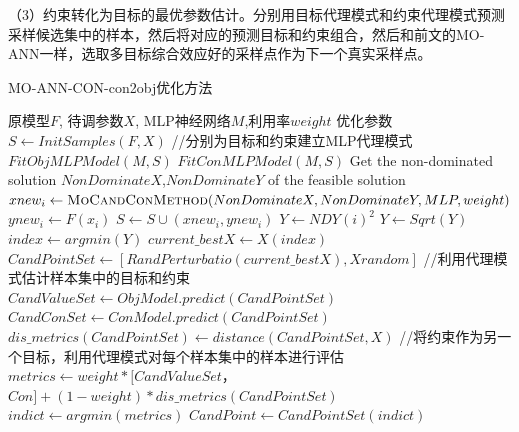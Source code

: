 （3）约束转化为目标的最优参数估计。分别用目标代理模式和约束代理模式预测采样候选集中的样本，然后将对应的预测目标和约束组合，然后和前文的MO-ANN一样，选取多目标综合效应好的采样点作为下一个真实采样点。

\renewcommand{\algorithmicrequire}{\textbf{输入:}}
\renewcommand{\algorithmicensure}{\textbf{输出:}}
\begin{algorithm}
        \caption{MO-ANN-CON-con2obj优化方法}
        \begin{algorithmic}[1] %
            \Require 原模型$F$, 待调参数$X$, MLP神经网络$M$,利用率$weight$
            \Ensure 优化参数
            \State $S \gets InitSamples( F, X )$
            \State //分别为目标和约束建立MLP代理模式
                \State $FitObjMLPModel(M, S)$
                 \State $FitConMLPModel(M, S)$
                 \State Get the non-dominated solution $NonDominateX$,$NonDominateY$ of the feasible solution 
                \State $xnew_i \gets \Call {MoCandConMethod}{NonDominateX,NonDominateY,MLP,weight}$
                \State $ynew_i \gets F(x_i)$
                \State $S \gets S \cup (xnew_i,ynew_i)$
            \EndFor
                  \State $Y \gets NDY(i)^2 $
              \EndFor
              \State $Y \gets Sqrt(Y)$
              \State $index \gets argmin(Y)$
              \State $current\_bestX \gets X(index)$ 
              \State $CandPointSet \gets [RandPerturbatio(current\_bestX),Xrandom]$
              \State //利用代理模式估计样本集中的目标和约束
              \State $CandValueSet \gets ObjModel.predict(CandPointSet)$
               \State $CandConSet \gets ConModel.predict(CandPointSet)$
              \State $dis\_metrics(CandPointSet) \gets distance(CandPointSet,X)$
              \State //将约束作为另一个目标，利用代理模式对每个样本集中的样本进行评估
              \State $metrics \gets weight * [CandValueSet$，$Con] + (1-weight) * dis\_metrics(CandPointSet)$
              \State $indict \gets argmin(metrics)$
              \State $CandPoint \gets CandPointSet(indict)$
            \EndFunction
        \end{algorithmic}
\end{algorithm}
